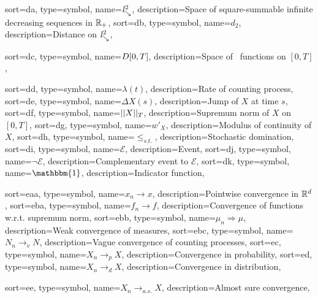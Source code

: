 {
	sort={da},
	type=symbol,
	name={$\mathit{l}^2_{\searrow}$},
	description={Space of square-summable infinite decreasing sequences in $\mathbb{R}_+$, \pageref{D: ld}}
}
{
	sort={db},
	type=symbol,
	name={$d_2$},
	description={Distance on $\mathit{l}^2_{\searrow}$, \pageref{D: ld}}
}

{
	sort={dc},
	type=symbol,
name={$D[0, T]$},
description={Space of \cadlag~functions on $[0,T]$, \pageref{D: DT}}
}

{
	sort={dd},
	type=symbol,
name={$\lambda(t)$},
description={Rate of counting process, \pageref{D: def gamma(A)}}
}
{
	sort={de},
	type=symbol,
name={$\Delta X(s)$},
description={Jump of $X$ at time $s$, \pageref{I: DeltaX}}
}
{
	sort={df},
	type=symbol,
name={$||X||_T$},
description={Supremum norm of $X$ on $[0,T]$, \pageref{I: supnorm}}
}
{
	sort={dg},
	type=symbol,
	name={$w'_X$},
	description={Modulus of continuity of $X$, \pageref{D: modulus of continuity}}
}
{
	sort={dh},
	type=symbol,
	name={$\leq_{s.t.}$},
	description={Stochastic domination, \pageref{E: stoch dom.}}
}
{
sort={di},
type=symbol,
name={$\mathcal{E}$},
description={Event, \pageref{E: First Total Probability Argument}}
}
{
sort={dj},
type=symbol,
name={$\neg\mathcal{E}$},
description={Complementary event to $\mathcal{E}$, \pageref{E: First Total Probability Argument}}
}
{
sort={dk},
type=symbol,
name={$\mathbbm{1}$},
description={Indicator function, \pageref{E: def Z}}
}


{
	sort={eaa},
	type=symbol,
	name={$x_n \rightarrow x$},
	description={Pointwise convergence in $\mathbb{R}^d$, \pageref{T: folk theorem}}
}
{
	sort={eba},
	type=symbol,
	name={$f_n \rightarrow f$},
	description={Convergence of functions w.r.t. supremum norm, \pageref{L: Deterministic Lemma}}
}
{
sort={ebb},
type=symbol,
name={$\mu_n \Rightarrow \mu$},
description={Weak convergence of measures, \pageref{D: weak convergence}}
}
{
sort={ebc},
type=symbol,
name={$N_n \rightarrow_v N$},
description={Vague convergence of counting processes, \pageref{D: vague convergence}}
}
{
	sort={ec},
	type=symbol,
	name={$X_n \rightarrow_p X$},
	description={Convergence in probability, \pageref{I: conv prob}}
}
{
	sort={ed},
	type=symbol,
	name={$X_n \rightarrow_d X$},
	description={Convergence in distribution, \pageref{D: weak convergence}}
}

{
	sort={ee},
	type=symbol,
	name={$X_n \rightarrow_{a.s.} X$},
	description={Almost sure convergence, \pageref{T: Skorohod}}
}
